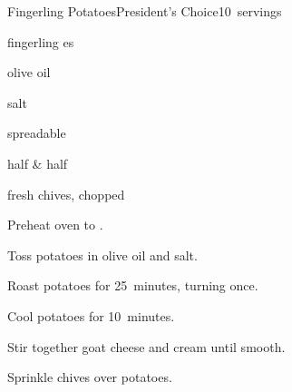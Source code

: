 \begin{recipe}{Fingerling Potatoes}{President's Choice}{10~servings}

\begin{ingredients}
\item {} fingerling es
\item {} olive oil
\item \tp{\half} salt
\item {} spreadable 
\item {} half \& half 
\item {} fresh chives, chopped
\end{ingredients}

\begin{directions}
\item Preheat oven to .
\item Toss potatoes in olive oil and salt.
\item Roast potatoes for 25~minutes, turning once.
\item Cool potatoes for 10~minutes.
\item Stir together goat cheese and cream until smooth.
\item Sprinkle chives over potatoes.
\end{directions}

\end{recipe}
